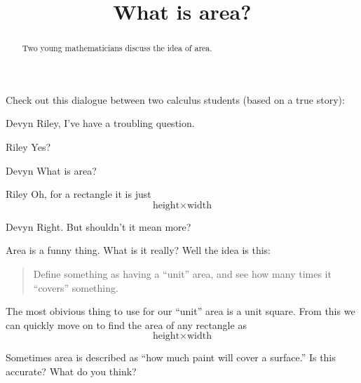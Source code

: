 \documentclass{ximera}
\title[Break-Ground:]{What is area?}
\begin{document}
\begin{abstract}
Two young mathematicians discuss the idea of area.
\end{abstract}
\maketitle




Check out this dialogue between two calculus students (based on a true
story):

\begin{dialogue}
\item[Devyn] Riley, I've have a troubling question.
\item[Riley] Yes? 
\item[Devyn] What is area?
\item[Riley] Oh, for a rectangle it is just
  \[
  \text{height}
  \times
  \text{width}
  \]
\item[Devyn] Right. But shouldn't it mean more?
\end{dialogue}

Area is a funny thing. What is it really? Well the idea is this:
\begin{quote}
Define something as having a ``unit'' area, and see how many times it
``covers'' something.
\end{quote}
The most obivious thing to use for our ``unit'' area is a unit
square. From this we can quickly move on to find the area of any
rectangle as
  \[
  \text{height}
  \times
  \text{width}
  \]
\begin{problem}
  Sometimes area is described as ``how much paint will cover a surface.''
  Is this accurate? What do you think?
  \begin{freeResponse}
  \end{freeResponse}
\end{problem}

\end{document}
